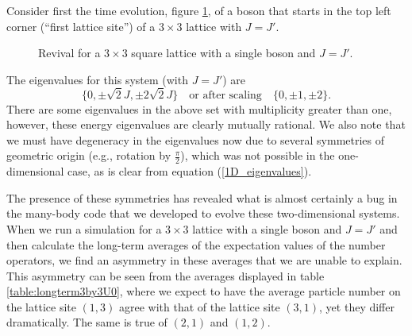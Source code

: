 \documentclass[prb, twocolumn, final]{revtex4-1}
\theoremstyle{plain}
\begin{document}
Consider first the time evolution, figure \ref{3by3_equal_hop_U0}, of
a boson that starts in the top left corner (``first lattice site'') of
a $3 \times3$ lattice with $J=J'$.
\begin{figure}[H]
     \caption{Revival for a $3 \times 3$ square lattice with a
     single boson and $J=J'$.}
     \label{3by3_equal_hop_U0}
\end{figure}

The eigenvalues for this system (with $J =J'$) are
\begin{equation*}
    \lbrace 0, \pm\sqrt{2} J, \pm 2 \sqrt{2} J \rbrace
    \quad \text{or after scaling} \quad
    \lbrace 0,\pm 1,\pm 2 \rbrace.
\end{equation*}
There are some eigenvalues in the above set with multiplicity greater than one,
however, these energy eigenvalues are clearly mutually rational. We also note
that we must have degeneracy in the eigenvalues now due to several symmetries of
geometric origin (e.g., rotation by $\frac{\pi}{2}$), which was not possible in
the one-dimensional case, as is clear from equation (\ref{1D_eigenvalues}).

The presence of these symmetries has revealed what is almost certainly a bug
in the many-body code that we developed to evolve these two-dimensional systems.
When we run a simulation for a $3\times3$ lattice with a single boson and
$J=J'$ and then calculate the long-term averages of the expectation values of
the number operators, we find an asymmetry in these averages that we are unable
to explain. This asymmetry can be seen from the averages displayed in table
\ref{table:longterm3by3U0}, where we expect to have the average particle number
on the lattice site $(1,3)$ agree with that of the lattice site $(3,1)$, yet
they differ dramatically. The same is true of $(2,1)$ and $(1,2)$.
\end{document}
